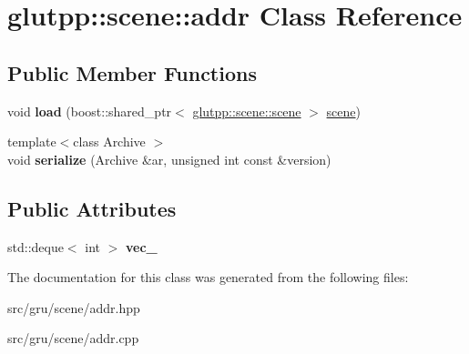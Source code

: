 \hypertarget{classglutpp_1_1scene_1_1addr}{\section{glutpp\-:\-:scene\-:\-:addr \-Class \-Reference}
\label{classglutpp_1_1scene_1_1addr}
}
\subsection*{\-Public \-Member \-Functions}
\begin{DoxyCompactItemize}
\item 
\hypertarget{classglutpp_1_1scene_1_1addr_a5320c5384baf62999e99a248543a55a5}{void {\bfseries load} (boost\-::shared\-\_\-ptr$<$ \hyperlink{classglutpp_1_1scene_1_1scene}{glutpp\-::scene\-::scene} $>$ \hyperlink{classglutpp_1_1scene_1_1scene}{scene})}\label{classglutpp_1_1scene_1_1addr_a5320c5384baf62999e99a248543a55a5}

\item 
\hypertarget{classglutpp_1_1scene_1_1addr_a3518de6b590cb44ee30c7297664da2c8}{{\footnotesize template$<$class Archive $>$ }\\void {\bfseries serialize} (\-Archive \&ar, unsigned int const \&version)}\label{classglutpp_1_1scene_1_1addr_a3518de6b590cb44ee30c7297664da2c8}

\end{DoxyCompactItemize}
\subsection*{\-Public \-Attributes}
\begin{DoxyCompactItemize}
\item 
\hypertarget{classglutpp_1_1scene_1_1addr_a6ed48e5e2065fc823d56e0fbe744569a}{std\-::deque$<$ int $>$ {\bfseries vec\-\_\-}}\label{classglutpp_1_1scene_1_1addr_a6ed48e5e2065fc823d56e0fbe744569a}

\end{DoxyCompactItemize}


\-The documentation for this class was generated from the following files\-:\begin{DoxyCompactItemize}
\item 
src/gru/scene/addr.\-hpp\item 
src/gru/scene/addr.\-cpp\end{DoxyCompactItemize}
